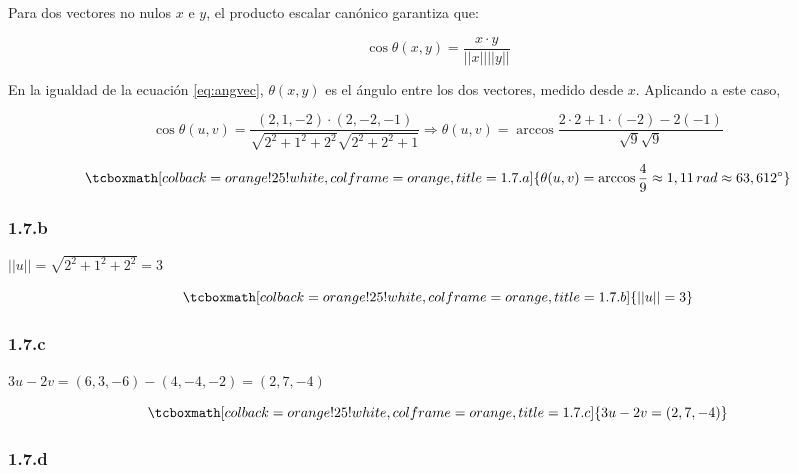 \documentclass{article}
\begin{document}
Para dos vectores no nulos $x$ e $y$, el producto escalar canónico garantiza que:

\begin{equation}
\cos \theta(x,y) = \frac{x \cdot y}{||x|| ||y||}
\label{eq:angvec}
\end{equation}

En la igualdad de la ecuación \ref{eq:angvec}, $\theta(x, y)$ es el ángulo entre los dos vectores, medido desde $x$. Aplicando a este caso,

\begin{equation}
\cos \theta(u,v) = \frac{(2, 1, -2) \cdot (2, -2, -1)}{\sqrt{2^2 + 1^2 + 2^2} \sqrt{2^2 + 2^2 + 1}} \Rightarrow \theta(u, v) =  \arccos \frac{2 \cdot 2 + 1 \cdot (-2) -2 (-1)}{\sqrt{9} \sqrt{9}}
\end{equation}

\begin{equation}
\tcboxmath[colback=orange!25!white,colframe=orange,title=1.7.a]
{ \theta(u, v) = \arccos \frac{4}{9} \approx 1,11 \mathop{rad} \approx 63,612^{\circ} }
\end{equation}

\subsubsection*{1.7.b}
\label{subsubsec:1.7.b}

$||u|| = \sqrt{2^2 + 1^2 + 2^2} = 3$

\begin{equation}
\tcboxmath[colback=orange!25!white,colframe=orange,title=1.7.b]
{ ||u|| = 3 }
\end{equation}

\subsubsection*{1.7.c}
\label{subsubsec:1.7.c}

$3u - 2v = (6, 3, -6) - (4, -4, -2) = (2, 7, -4)$

\begin{equation}
\tcboxmath[colback=orange!25!white,colframe=orange,title=1.7.c]
{ 3u - 2v = (2, 7, -4) }
\end{equation}

\subsubsection*{1.7.d}
\label{subsubsec:1.7.d}
\end{document}
